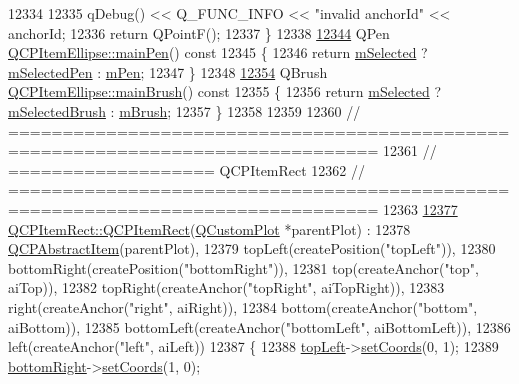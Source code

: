 \begin{DoxyCode}
12334   
12335   qDebug() << Q\_FUNC\_INFO << \textcolor{stringliteral}{"invalid anchorId"} << anchorId;
12336   \textcolor{keywordflow}{return} QPointF();
12337 \}
12338 
\hypertarget{a00115_source_l12344}{}\hyperlink{a00035_afc78d49ed5ffa886bccf18f297f83d30}{12344} QPen \hyperlink{a00035_afc78d49ed5ffa886bccf18f297f83d30}{QCPItemEllipse::mainPen}()\textcolor{keyword}{ const}
12345 \textcolor{keyword}{}\{
12346   \textcolor{keywordflow}{return} \hyperlink{a00022_a4bdb3457dad1d268c0f78a44152b9645}{mSelected} ? \hyperlink{a00035_a57b047abfce6f1a84ed46ca668c90e21}{mSelectedPen} : \hyperlink{a00035_a16ad9389acf028a7e4ac8fd7a550b2e4}{mPen};
12347 \}
12348 
\hypertarget{a00115_source_l12354}{}\hyperlink{a00035_a2a9757204877c9d0fd07adfb26d6b1d8}{12354} QBrush \hyperlink{a00035_a2a9757204877c9d0fd07adfb26d6b1d8}{QCPItemEllipse::mainBrush}()\textcolor{keyword}{ const}
12355 \textcolor{keyword}{}\{
12356   \textcolor{keywordflow}{return} \hyperlink{a00022_a4bdb3457dad1d268c0f78a44152b9645}{mSelected} ? \hyperlink{a00035_a2e49d5547478aa36910ed8a2dcc8a5c0}{mSelectedBrush} : \hyperlink{a00035_a6fa59478cd3ad1b10e6c1f6cedc84bd6}{mBrush};
12357 \}
12358 
12359 
12360 \textcolor{comment}{// ================================================================================}
12361 \textcolor{comment}{// =================== QCPItemRect}
12362 \textcolor{comment}{// ================================================================================}
12363 
\hypertarget{a00115_source_l12377}{}\hyperlink{a00039_a412ad1579f7a1fba453d0fa28c496cbc}{12377} \hyperlink{a00039_a412ad1579f7a1fba453d0fa28c496cbc}{QCPItemRect::QCPItemRect}(\hyperlink{a00030_d8/d00/a00186}{QCustomPlot} *parentPlot) :
12378   \hyperlink{a00022}{QCPAbstractItem}(parentPlot),
12379   topLeft(createPosition(\textcolor{stringliteral}{"topLeft"})),
12380   bottomRight(createPosition(\textcolor{stringliteral}{"bottomRight"})),
12381   top(createAnchor(\textcolor{stringliteral}{"top"}, aiTop)),
12382   topRight(createAnchor(\textcolor{stringliteral}{"topRight"}, aiTopRight)),
12383   right(createAnchor(\textcolor{stringliteral}{"right"}, aiRight)),
12384   bottom(createAnchor(\textcolor{stringliteral}{"bottom"}, aiBottom)),
12385   bottomLeft(createAnchor(\textcolor{stringliteral}{"bottomLeft"}, aiBottomLeft)),
12386   left(createAnchor(\textcolor{stringliteral}{"left"}, aiLeft))
12387 \{
12388   \hyperlink{a00039_aa70feeef173489b03c3fbe906a5023c4}{topLeft}->\hyperlink{a00038_aa988ba4e87ab684c9021017dcaba945f}{setCoords}(0, 1);
12389   \hyperlink{a00039_a409f3bfe615a7e322bb3d4d193d85b26}{bottomRight}->\hyperlink{a00038_aa988ba4e87ab684c9021017dcaba945f}{setCoords}(1, 0);

\end{DoxyCode}
